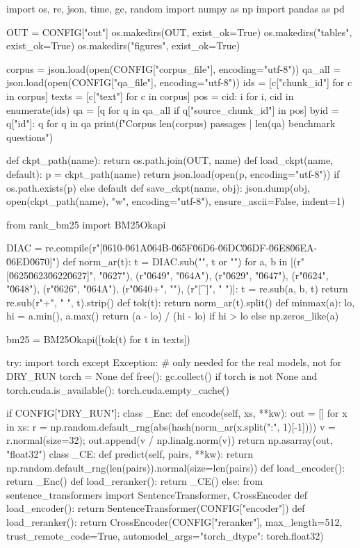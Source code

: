 import os, re, json, time, gc, random
import numpy as np
import pandas as pd

OUT = CONFIG["out"]
os.makedirs(OUT, exist_ok=True)
os.makedirs("tables", exist_ok=True)
os.makedirs("figures", exist_ok=True)

corpus = json.load(open(CONFIG["corpus_file"], encoding="utf-8"))
qa_all = json.load(open(CONFIG["qa_file"], encoding="utf-8"))
ids = [c["chunk_id"] for c in corpus]
texts = [c["text"] for c in corpus]
pos = {cid: i for i, cid in enumerate(ids)}
qa = [q for q in qa_all if q["source_chunk_id"] in pos]
byid = {q["id"]: q for q in qa}
print(f"Corpus {len(corpus)} passages | {len(qa)} benchmark questions")

def ckpt_path(name): return os.path.join(OUT, name)
def load_ckpt(name, default):
    p = ckpt_path(name)
    return json.load(open(p, encoding="utf-8")) if os.path.exists(p) else default
def save_ckpt(name, obj):
    json.dump(obj, open(ckpt_path(name), "w", encoding="utf-8"), ensure_ascii=False, indent=1)

from rank_bm25 import BM25Okapi

DIAC = re.compile(r"[\u0610-\u061A\u064B-\u065F\u06D6-\u06DC\u06DF-\u06E8\u06EA-\u06ED\u0670]")
def norm_ar(t):
    t = DIAC.sub("", t or "")
    for a, b in [(r"[\u0625\u0623\u0622\u0627]", "\u0627"), (r"\u0649", "\u064A"),
                 (r"\u0629", "\u0647"), (r"\u0624", "\u0648"), (r"\u0626", "\u064A"),
                 (r"\u0640+", ""), (r"[^\w\s]", " ")]:
        t = re.sub(a, b, t)
    return re.sub(r"\s+", " ", t).strip()
def tok(t): return norm_ar(t).split()
def minmax(a):
    lo, hi = a.min(), a.max()
    return (a - lo) / (hi - lo) if hi > lo else np.zeros_like(a)

bm25 = BM25Okapi([tok(t) for t in texts])

try:
    import torch
except Exception:          # only needed for the real models, not for DRY_RUN
    torch = None
def free():
    gc.collect()
    if torch is not None and torch.cuda.is_available():
        torch.cuda.empty_cache()

if CONFIG["DRY_RUN"]:
    class _Enc:
        def encode(self, xs, **kw):
            out = []
            for x in xs:
                r = np.random.default_rng(abs(hash(norm_ar(x.split(":", 1)[-1]))) %
                v = r.normal(size=32); out.append(v / np.linalg.norm(v))
            return np.asarray(out, "float32")
    class _CE:
        def predict(self, pairs, **kw):
            return np.random.default_rng(len(pairs)).normal(size=len(pairs))
    def load_encoder(): return _Enc()
    def load_reranker(): return _CE()
else:
    from sentence_transformers import SentenceTransformer, CrossEncoder
    def load_encoder(): return SentenceTransformer(CONFIG["encoder"])
    def load_reranker():
        return CrossEncoder(CONFIG["reranker"], max_length=512, trust_remote_code=True,
                            automodel_args={"torch_dtype": torch.float32})

